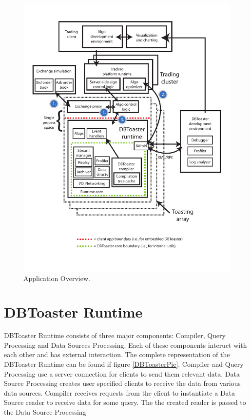 \documentclass[11pt]{article}
\begin{document}
\begin{figure}
  \includegraphics[width=4.50in]{finapp.pdf}
  \caption{Application Overview.}
  \label{TheBigPicture}
\end{figure}



\section{DBToaster Runtime}

DBToaster Runtime consists of three major components: Compiler, Query Processing and Data Sources Processing. Each of these components interuct with each other and has external interaction. The complete representation of the DBToaster Runtime can be found if figure \ref{DBToasterPic}. Compiler and Query Processing use a server connection for clients to send them relevant data. Data Source Processing creates user specified clients to receive the data from various data sources. Compiler receives requests from the client to instantiate a Data Source reader to receive data for some query. The the created reader is passed to the Data Source Processing
\end{document}
